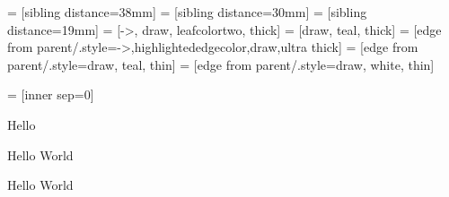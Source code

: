 \documentclass{beamer}
\begin{document}
	
	
	
	
	 = [sibling distance=38mm]
	 = [sibling distance=30mm]
	 = [sibling distance=19mm]
	 = [->, draw, leafcolortwo, thick]
	 = [draw, teal, thick]
	 = [edge from parent/.style={->,highlightededgecolor,draw,ultra thick}]
	 = [edge from parent/.style={draw, teal, thin}]
	 = [edge from parent/.style={draw, white, thin}]
	
	 = [inner sep=0]
	
	
	
	
	
	
	
	
	
	
	\begin{frame}{Hello}
		
		\begin{block}{Hello}
			World
		\end{block}
		
		
		\begin{alertblock}{Hello}
			World
		\end{alertblock}
		
	\end{frame}
	
	
	
	
	
	
	
	
	
\end{document}
